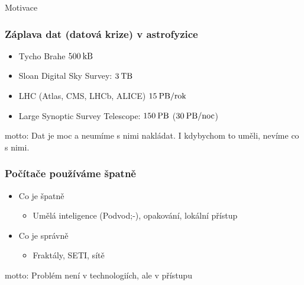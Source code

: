 \documentclass[fleqn]{beamer}
\begin{document}
\begin{section}{Motivace}
\begin{frame}\frametitle{Záplava dat (datová krize) v astrofyzice}
\begin{itemize}

\item  Tycho Brahe $500\:\rm kB$ 
\item  Sloan Digital Sky Survey: $3\:\rm TB$
\item  LHC (Atlas, CMS, LHCb, ALICE) $15\:\rm PB/rok$
\item  Large Synoptic Survey Telescope: $150\:\rm PB$ ($30\:\rm PB/noc$)

\end{itemize}

motto: Dat je moc a neumíme s nimi nakládat. I kdybychom to uměli,
nevíme co s nimi.

\end{frame}


\begin{frame}\frametitle{Počítače používáme špatně}

\begin{itemize}
\item  Co je špatně
    \begin{itemize}
    \item  Umělá inteligence (Podvod;-), opakování, lokální přístup    
    \end{itemize}
\item  Co je správně
  \begin{itemize}
  \item  Fraktály, SETI, sítě
  \end{itemize}
\end{itemize}

motto: Problém není v technologiích, ale v přístupu
\end{frame}
\end{section}
\end{document}
